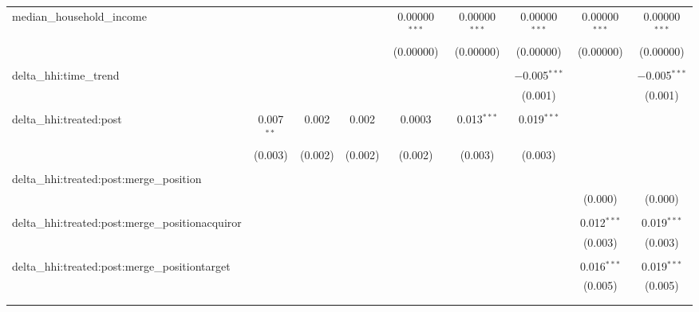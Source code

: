 \begin{table}[H]
{\begin{tabular}{@{\extracolsep{5pt}}lcccccccc}
  median\_household\_income &  &  &  & 0.00000$^{***}$ & 0.00000$^{***}$ & 0.00000$^{***}$ & 0.00000$^{***}$ & 0.00000$^{***}$ \\  

   &  &  &  & (0.00000) & (0.00000) & (0.00000) & (0.00000) & (0.00000) \\  

   & & & & & & & & \\  

  delta\_hhi:time\_trend &  &  &  &  &  & $-$0.005$^{***}$ &  & $-$0.005$^{***}$ \\  

   &  &  &  &  &  & (0.001) &  & (0.001) \\  

   & & & & & & & & \\  

  delta\_hhi:treated:post & 0.007$^{**}$ & 0.002 & 0.002 & 0.0003 & 0.013$^{***}$ & 0.019$^{***}$ &  &  \\  

   & (0.003) & (0.002) & (0.002) & (0.002) & (0.003) & (0.003) &  &  \\  

   & & & & & & & & \\  

  delta\_hhi:treated:post:merge\_position &  &  &  &  &  &  &  &  \\  

   &  &  &  &  &  &  & (0.000) & (0.000) \\  

   & & & & & & & & \\  

  delta\_hhi:treated:post:merge\_positionacquiror &  &  &  &  &  &  & 0.012$^{***}$ & 0.019$^{***}$ \\  

   &  &  &  &  &  &  & (0.003) & (0.003) \\  

   & & & & & & & & \\  

  delta\_hhi:treated:post:merge\_positiontarget &  &  &  &  &  &  & 0.016$^{***}$ & 0.019$^{***}$ \\  

   &  &  &  &  &  &  & (0.005) & (0.005) \\  

   & & & & & & & & \\  

 \hline \\[-1.8ex]  


\end{tabular}}
\end{table}

